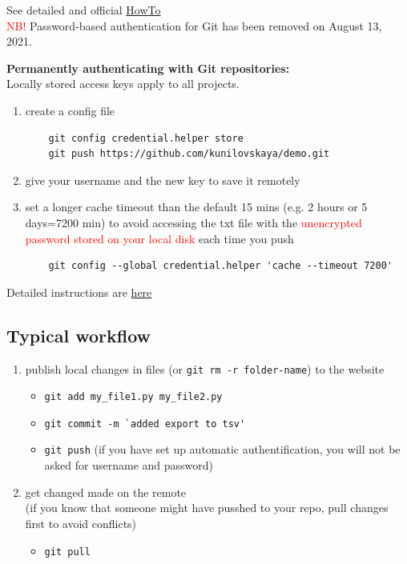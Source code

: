 \documentclass[a4paper,11pt]{article}
\begin{document}
See detailed and official  \href{https://docs.github.com/en/enterprise-server@3.4/get-started/getting-started-with-git/about-remote-repositories}{HowTo} \\

\textcolor{red}{NB!} Password-based authentication for Git has been removed on August 13, 2021.

\bigskip

\textbf{Permanently authenticating with Git repositories:} \\
Locally stored access keys apply to all projects.
\begin{enumerate}
	\item create a config file \\
	\begin{lstlisting}
	git config credential.helper store
	git push https://github.com/kunilovskaya/demo.git
	\end{lstlisting}
	\item give your username and the new key to save it remotely
	\item set a longer cache timeout than the default 15 mins (e.g. 2 hours or 5 days=7200 min) to avoid accessing the txt file with the \textcolor{red}{unencrypted password stored on your local disk} each time you push
	\begin{lstlisting}
	git config --global credential.helper 'cache --timeout 7200' 
	\end{lstlisting}
	
\end{enumerate}

Detailed instructions are \href{https://stackoverflow.com/questions/8588768/how-do-i-avoid-the-specification-of-the-username-and-password-at-every-git-push}{here}

\subsection{Typical workflow}

\begin{enumerate}
	\item publish local changes in files (or \verb|git rm -r folder-name|) to the website
	\begin{itemize}
		\item \verb|git add my_file1.py my_file2.py|
		\item \verb|git commit -m `added export to tsv'|
		\item \verb|git push| (if you have set up automatic authentification, you will not be asked for username and password)
	\end{itemize}
	\item get changed made on the remote \\
	(if you know that someone might have pusshed to your repo, pull changes first to avoid conflicts)
	\begin{itemize}
		\item \verb|git pull|
	\end{itemize}
\end{enumerate}
\end{document}
